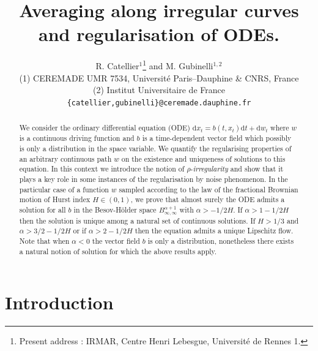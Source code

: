 \documentclass[a4paper,11pt]{article}
\newcommand{\mathd}{\mathrm{d}}
\newcommand{\tmtextit}[1]{{\itshape{#1}}}
\begin{document}
\title{
  Averaging along irregular curves\\
  and regularisation of ODEs.
}

\author{  R. Catellier$^{1}$\footnote{Present address : IRMAR, Centre Henri Lebesgue, Universit\'e de Rennes 1.} and
  M. Gubinelli$^{1,2}$
\\[.1cm] {\small 
(1) CEREMADE  UMR 7534,  Universit\'e Paris--Dauphine \& CNRS, France
}
\\ {\small
(2) Institut Universitaire de France
}
\\ {\small \texttt{\{catellier,gubinelli\}@ceremade.dauphine.fr} }
}


\maketitle

\begin{abstract}
  We consider the ordinary differential equation (ODE) $\mathd x_{t} =b
  (t,x_{t} ) \mathd t+ \mathd w_{t}$ where $w$ is a continuous driving
  function and $b$ is a time-dependent vector field which possibly is only a
  distribution in the space variable. We quantify the regularising properties
  of an arbitrary continuous path $w$ on the existence and uniqueness of
  solutions to this equation. In this context we introduce the notion of
  $\rho$-\tmtextit{irregularity} and show that it plays a key role in some
  instances of the regularisation by noise phenomenon. In the particular case
  of a function $w$ sampled according to the law of the fractional Brownian
  motion of Hurst index $H \in (0,1)$, we prove that almost surely the ODE
  admits a solution for all $b$ in the Besov-Hölder space $B^{\alpha
  +1}_{\infty , \infty}$ with $\alpha >-1/2H$. If $\alpha >1-1/2H$ then the
  solution is unique among a natural set of continuous solutions. If $H>1/3$
  and $\alpha >3/2-1/2H$ or if $\alpha >2-1/2H$ then the equation admits a
  unique Lipschitz flow. Note that when $\alpha <0$ the vector field $b$ is
  only a distribution, nonetheless there exists a natural notion of solution
  for which the above results apply.
  
  
\end{abstract}

\tableofcontents

\section{Introduction}\label{sec:intro}
\end{document}
